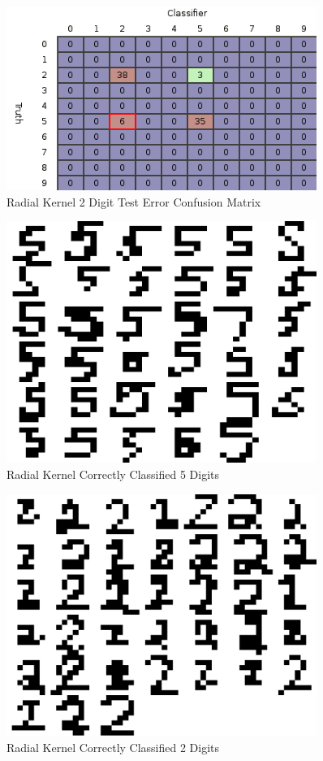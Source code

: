 \documentclass{article}
\begin{document}
\begin{figure}
\centering
\includegraphics[width=0.9\textwidth]{images/test2_5_confusion_radial.png}
\caption{Radial Kernel 2 Digit Test Error Confusion Matrix}
\label{radial2testconfusion}
\end{figure}

\begin{figure}
\centering
\includegraphics[width=0.9\textwidth]{images/test2_5_correct5_radial.png}
\caption{Radial Kernel Correctly Classified 5 Digits}
\label{radial5correcttest}
\end{figure}

\begin{figure}
\centering
\includegraphics[width=0.9\textwidth]{images/test2_5_correct2_radial.png}
\caption{Radial Kernel Correctly Classified 2 Digits}
\label{radial2correcttest}
\end{figure}
\end{document}
